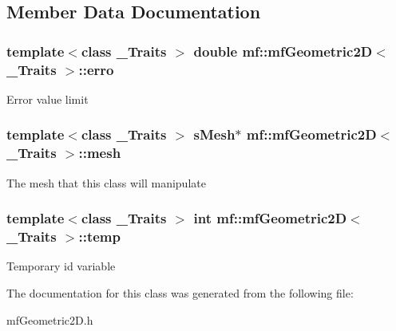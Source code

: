 \subsection{Member Data Documentation}
\hypertarget{classmf_1_1mfGeometric2D_a0aafeb91782dbf312e6c4edb1d24958c}{
\subsubsection[{erro}]{\setlength{\rightskip}{0pt plus 5cm}template$<$class \_\-Traits $>$ double {\bf mf::mfGeometric2D}$<$ \_\-Traits $>$::{\bf erro}}}
\label{classmf_1_1mfGeometric2D_a0aafeb91782dbf312e6c4edb1d24958c}
Error value limit \hypertarget{classmf_1_1mfGeometric2D_a67a3149e81f236edf5f9739cc994eb36}{
\subsubsection[{mesh}]{\setlength{\rightskip}{0pt plus 5cm}template$<$class \_\-Traits $>$ {\bf sMesh}$\ast$ {\bf mf::mfGeometric2D}$<$ \_\-Traits $>$::{\bf mesh}}}
\label{classmf_1_1mfGeometric2D_a67a3149e81f236edf5f9739cc994eb36}
The mesh that this class will manipulate \hypertarget{classmf_1_1mfGeometric2D_a8fb3dcfd6e088127cdbed83a82bc525f}{
\subsubsection[{temp}]{\setlength{\rightskip}{0pt plus 5cm}template$<$class \_\-Traits $>$ int {\bf mf::mfGeometric2D}$<$ \_\-Traits $>$::{\bf temp}}}
\label{classmf_1_1mfGeometric2D_a8fb3dcfd6e088127cdbed83a82bc525f}
Temporary id variable 

The documentation for this class was generated from the following file:\begin{DoxyCompactItemize}
\item 
mfGeometric2D.h\end{DoxyCompactItemize}
